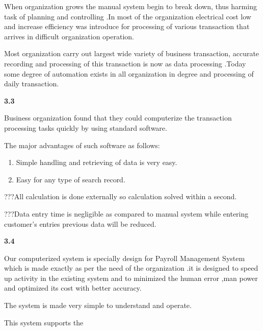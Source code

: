 \documentclass{article} %
\begin{document}
\noindent When organization grows the manual system begin to break down, thus harming task of planning and controlling .In most of the organization electrical cost low and increase efficiency was introduce for processing of various transaction that arrives in difficult organization operation. 

\noindent Most organization carry out largest wide variety of business transaction, accurate recording and processing of this transaction is now as data processing .Today some degree of automation exists in all organization in degree and processing of daily transaction. 

\noindent \textbf{3.3  }

\noindent 

\noindent Business organization found that they could computerize the transaction processing tasks quickly by using standard software. 

\noindent The major advantages of such software as follows:

\noindent 

\begin{enumerate}
\item  Simple handling and retrieving of data is very easy. 

\item  Easy for any type of search record. 
\end{enumerate}

\noindent ???All calculation is done externally so calculation solved within a second. 

\noindent ???Data entry time is negligible as compared to manual system while entering         customer's entries previous data will be reduced. 

\noindent 

\noindent 

\noindent \textbf{3.4 }\underbar{}

\noindent Our computerized system is specially design for Payroll Management System which is made exactly as per the need of the organization .it is designed to speed up activity in the existing system and to minimized the human error ,man power and optimized its cost with better accuracy. 

\noindent 

\noindent The system is made very simple to understand and operate. 

\noindent This system supports the 
\end{document}
